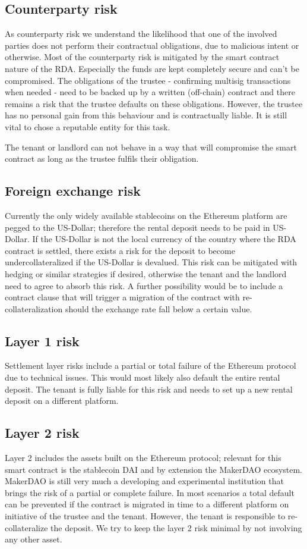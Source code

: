 \documentclass[12pt,a4paper,titlepage,oneside,english]{article}
\begin{document}
\subsection{Counterparty risk}
As counterparty risk we understand the likelihood that one of the involved parties does not perform their contractual obligations, due to malicious intent or otherwise.
Most of the counterparty risk is mitigated by the smart contract nature of the RDA. Especially the funds are kept completely secure and can't be compromised. The obligations of the trustee - confirming multisig transactions when needed - need to be backed up by a written (off-chain) contract and there remains a risk that the trustee defaults on these obligations. However, the trustee has no personal gain from this behaviour and is contractually liable. It is still vital to chose a reputable entity for this task.

The tenant or landlord can not behave in a way that will compromise the smart contract as long as the trustee fulfils their obligation.

\subsection{Foreign exchange risk}
Currently the only widely available stablecoins on the Ethereum platform are pegged to the US-Dollar; therefore the rental deposit needs to be paid in US-Dollar. If the US-Dollar is not the local currency of the country where the RDA contract is settled, there exists a risk for the deposit to become undercollateralized if the US-Dollar is devalued. This risk can be mitigated with hedging or similar strategies if desired, otherwise the tenant and the landlord need to agree to absorb this risk. A further possibility would be to include a contract clause that will trigger a migration of the contract with re-collateralization should the exchange rate fall below a certain value.

\subsection{Layer 1 risk}
Settlement layer risks include a partial or total failure of the Ethereum protocol due to technical issues. This would most likely also default the entire rental deposit. The tenant is fully liable for this risk and needs to set up a new rental deposit on a different platform.

\subsection{Layer 2 risk}
Layer 2 includes the assets built on the Ethereum protocol; relevant for this smart contract is the stablecoin DAI and by extension the MakerDAO ecosystem. MakerDAO is still very much a developing and experimental institution that brings the risk of a partial or complete failure. In most scenarios a total default can be prevented if the contract is migrated in time to a different platform on initiative of the trustee and the tenant. However, the tenant is responsible to re-collateralize the deposit. We try to keep the layer 2 risk minimal by not involving any other asset.
\end{document}
